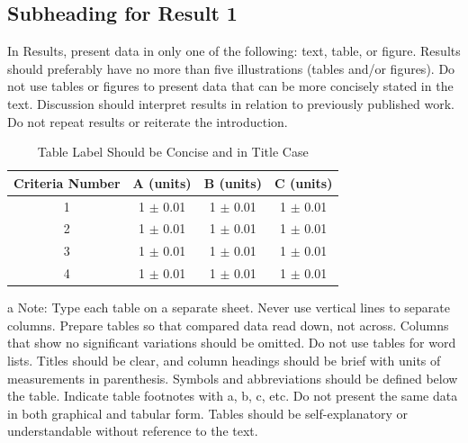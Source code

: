 \documentclass{strrespaper-journ}
\begin{document}
	    \subsection{Subheading for Result 1}
	        In Results, present data in only one of the following: text, table, or figure. Results should preferably have no more than five illustrations (tables and/or figures). Do not use tables or figures to present data that can be more concisely stated in the text. Discussion should interpret results in relation to previously published work. Do not repeat results or reiterate the introduction.
	        \begin{table}[htbp]
	            \begin{threeparttable}
	                \caption{Table Label Should be Concise and in Title Case }
	                \label{tab:concise_table}
	                \begin{tabular}{cccc}
	                    \toprule
	                    Criteria Number & A (units)       & B (units)       & C (units)       \\
	                    \midrule
	                    1               & 1 \(\pm \) 0.01 & 1 \(\pm \) 0.01 & 1 \(\pm \) 0.01 \\
	                    2               & 1 \(\pm \) 0.01 & 1 \(\pm \) 0.01 & 1 \(\pm \) 0.01 \\
	                    3               & 1 \(\pm \) 0.01 & 1 \(\pm \) 0.01 & 1 \(\pm \) 0.01 \\
	                    4               & 1 \(\pm \) 0.01 & 1 \(\pm \) 0.01 & 1 \(\pm \) 0.01 \\
	                    \bottomrule
	                \end{tabular}
					\begin{tablenotes}
						\small
	                    \item[a] Note: Type each table on a separate sheet.
	                    Never use vertical lines to separate columns.
	                    Prepare tables so that compared data read down, not across.
	                    Columns that show no significant variations should be omitted.
	                    Do not use tables for word lists.
	                    Titles should be clear, and column headings should be brief with units of measurements in parenthesis.
	                    Symbols and abbreviations should be defined below the table.
	                    Indicate table footnotes with a, b, c, etc.
	                    Do not present the same data in both graphical and tabular form.
	                    Tables should be self-explanatory or understandable without reference to the text.
	                \end{tablenotes}
	            \end{threeparttable}
	        \end{table}
\end{document}
